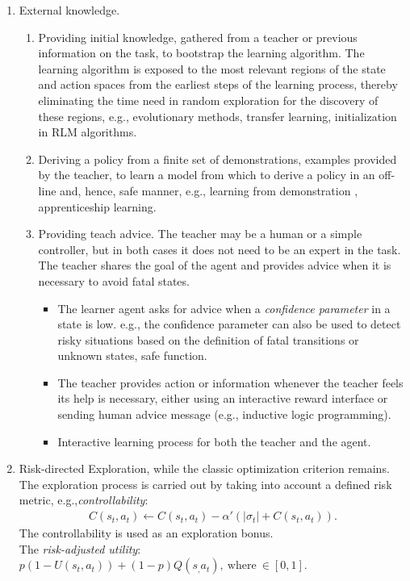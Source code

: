 \begin{enumerate}
\item
	External knowledge.
	\begin{enumerate}
	\item
		Providing initial knowledge, gathered from a teacher or previous information on the task, to bootstrap the learning algorithm. 
		The learning algorithm is exposed to the most relevant regions of the state and action spaces from the earliest steps of the learning process, thereby eliminating the time need in random exploration for the discovery of these regions, e.g., evolutionary methods, transfer learning, initialization in RLM algorithms.
	\item
		Deriving a policy from a finite set of demonstrations, examples provided by the teacher, to learn a model from which to derive a policy in an off-line and, hence, safe manner, e.g., learning from demonstration \citep{Abbeel_2005}, apprenticeship learning.
	\item
		Providing teach advice.
		The teacher may be a human or a simple controller, but in both cases it does not need to be an expert in the task. The teacher shares the goal of the agent and provides advice when it is necessary to avoid fatal states.
		\begin{itemize}
		\item
		The learner agent asks for advice when a \emph{confidence parameter} in a state is low. e.g., the confidence parameter can also be used to detect risky situations based on the definition of fatal transitions or unknown states, safe function.
		\item
		The teacher provides action or information whenever the teacher feels its help is necessary, either using an interactive reward interface or sending human advice message (e.g., inductive logic programming).
		\item
		Interactive learning process for both the teacher and the agent.
		\end{itemize}
	\end{enumerate}
\item
	Risk-directed Exploration, while the classic optimization criterion remains. The exploration process is carried out by taking into account a defined risk metric, e.g.,\emph{controllability}:
	\begin{align}
	C(s_t, a_t) \leftarrow C(s_t, a_t) - \alpha' (\vert \sigma_t \vert + C(s_t, a_t)).
	\end{align}
	The controllability is used as an exploration bonus.\\
	The \emph{risk-adjusted utility}: $p(1-U(s_t,a_t)) + (1-p)Q(s_,a_t), \mathrm{~where~}  \in [0,1]$.
\end{enumerate}


